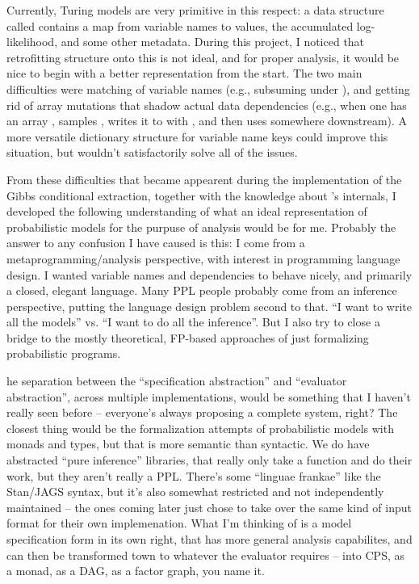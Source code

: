 Currently, Turing models are very primitive in this respect: a data structure called 
contains a map from variable names to values, the accumulated log-likelihood, and some other
metadata. During this project, I noticed that retrofitting structure onto this is not ideal, and for
proper analysis, it would be nice to begin with a better representation from the start. The two main
difficulties were matching of variable names (e.g., subsuming  under
), and getting rid of array mutations that shadow actual data dependencies (e.g.,
when one has an array , samples , writes it to  with
, and then uses  somewhere downstream).  A more versatile
dictionary structure for variable name keys could improve this situation, but wouldn't
satisfactorily solve all of the issues.

From these difficulties that became appearent during the implementation of the Gibbs conditional
extraction, together with the knowledge about \dppljl{}'s internals, I developed the following
understanding of what an ideal representation of probabilistic models for the purpuse of analysis
would be for me. Probably the answer to any confusion I have caused is this: I come from a
metaprogramming/analysis perspective, with interest in programming language design. I wanted
variable names and dependencies to behave nicely, and primarily a closed, elegant language. Many PPL
people probably come from an inference perspective, putting the language design problem second to
that. “I want to write all the models” vs. “I want to do all the inference”. But I also try to close
a bridge to the mostly theoretical, FP-based approaches of just formalizing probabilistic programs.

he separation between the “specification abstraction” and “evaluator abstraction”, across multiple
implementations, would be something that I haven’t really seen before – everyone’s always proposing
a complete system, right? The closest thing would be the formalization attempts of probabilistic
models with monads and types, but that is more semantic than syntactic. We do have abstracted “pure
inference” libraries, that really only take a function and do their work, but they aren’t really a
PPL. There’s some “linguae frankae” like the Stan/JAGS syntax, but it’s also somewhat restricted and
not independently maintained – the ones coming later just chose to take over the same kind of input
format for their own implemenation. What I’m thinking of is a model specification form in its own
right, that has more general analysis capabilites, and can then be transformed town to whatever the
evaluator requires – into CPS, as a monad, as a DAG, as a factor graph, you name it.

